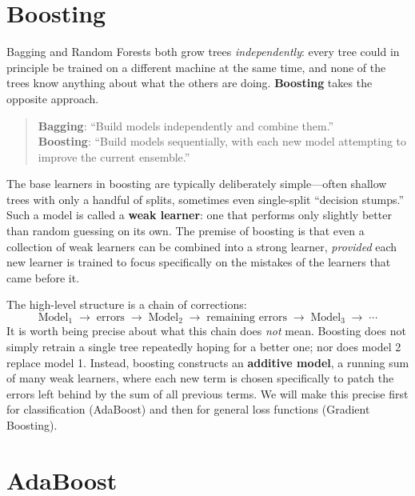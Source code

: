 \documentclass[12pt,a4paper]{article}
\begin{document}
\section{Boosting}

Bagging and Random Forests both grow trees \emph{independently}: every tree could in principle be trained on a different machine at the same time, and none of the trees know anything about what the others are doing. \textbf{Boosting} takes the opposite approach.

\begin{quote}
\textbf{Bagging}: ``Build models independently and combine them.'' \\
\textbf{Boosting}: ``Build models sequentially, with each new model attempting to improve the current ensemble.''
\end{quote}

The base learners in boosting are typically deliberately simple---often shallow trees with only a handful of splits, sometimes even single-split ``decision stumps.'' Such a model is called a \textbf{weak learner}: one that performs only slightly better than random guessing on its own. The premise of boosting is that even a collection of weak learners can be combined into a strong learner, \emph{provided} each new learner is trained to focus specifically on the mistakes of the learners that came before it.

The high-level structure is a chain of corrections:
$$
\text{Model}_1 \;\longrightarrow\; \text{errors} \;\longrightarrow\; \text{Model}_2 \;\longrightarrow\; \text{remaining errors} \;\longrightarrow\; \text{Model}_3 \;\longrightarrow\; \cdots
$$
It is worth being precise about what this chain does \emph{not} mean. Boosting does not simply retrain a single tree repeatedly hoping for a better one; nor does model 2 replace model 1. Instead, boosting constructs an \textbf{additive model}, a running sum of many weak learners, where each new term is chosen specifically to patch the errors left behind by the sum of all previous terms. We will make this precise first for classification (AdaBoost) and then for general loss functions (Gradient Boosting).

\section{AdaBoost}
\end{document}
